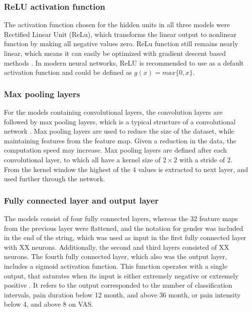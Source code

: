 \subsubsection*{\textbf{ReLU activation function}}
The activation function chosen for the hidden units in all three models were Rectified Linear Unit (ReLu), which transforms the linear output to nonlinear function by making all negative values zero. ReLu function still remains nearly linear, which means it can easily be optimized with gradient descent based methods \citep{Goodfellow2016}. In modern neural networks, ReLU is recommended to use as a default activation function and could be defined as $g(x) = max\{0, x\}$. 


\subsubsection*{\textbf{Max pooling layers}}
For the models containing convolutional layers, the convolution layers are followed by max pooling layers, which is a typical structure of a convolutional network \citep{LeCun2015, Goodfellow2016}.
Max pooling layers are used to reduce the size of the dataset, while maintaining features from the feature map. Given a reduction in the data, the computation speed may increase.\citep{Goodfellow2016,LeCun1998} 
Max pooling layers are defined after each convolutional layer, to which all have a kernel size of $2 \times 2$ with a stride of 2. From the kernel window the highest of the 4 values is extracted to next layer, and used further through the network. 

\subsubsection{\textbf{Fully connected layer and output layer}}
The models consist of four fully connected layers, whereas the 32 feature maps from the previous layer were flattened, and the notation for gender was included in the end of the string, which was used as input in the first fully connected layer with XX neurons. Additionally, the second and third layers consisted of XX neurons. The fourth fully connected layer, which also was the output layer, includes a sigmoid activation function. 
This function operates with a single output, that saturates when its input is either extremely negative or extremely positive \citep{Goodfellow2016}. It refers to the output corresponded to the number of classification intervals, pain duration below 12 month, and above 36 month, or pain intensity below 4, and above 8 on VAS. 


